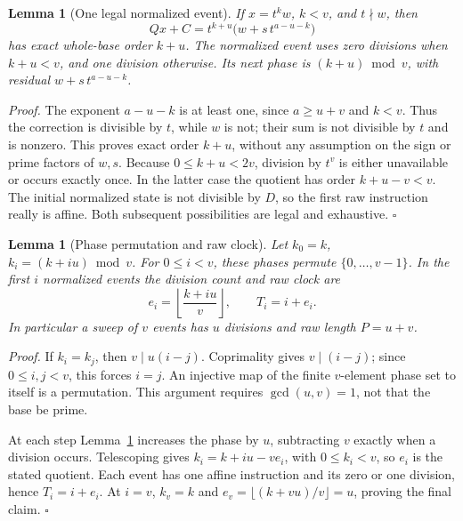 \documentclass[11pt,letterpaper]{article}
\newtheorem{lemma}[theorem]{Lemma}
\newenvironment{proof}{\noindent\textit{Proof.}}{\hfill\(\square\)}
\begin{document}
\begin{lemma}[One legal normalized event]\label{Event}
If \(x=t^k w\), \(k<v\), and \(t\nmid w\), then
\[
Qx+C=t^{k+u}\bigl(w+s\,t^{a-u-k}\bigr)
\]
has exact whole-base order \(k+u\). The normalized event uses zero divisions
when \(k+u<v\), and one division otherwise. Its next phase is
\((k+u)\bmod v\), with residual \(w+s\,t^{a-u-k}\).
\end{lemma}
\begin{proof}
The exponent \(a-u-k\) is at least one, since \(a\ge u+v\) and \(k<v\).
Thus the correction is divisible by \(t\), while \(w\) is not; their sum
is not divisible by \(t\) and is nonzero. This proves exact order \(k+u\),
without any assumption on the sign or prime factors of \(w,s\).
Because \(0\le k+u<2v\), division by \(t^v\) is either unavailable or occurs
exactly once. In the latter case the quotient has order \(k+u-v<v\).
The initial normalized state is not divisible by \(D\), so the first raw
instruction really is affine. Both subsequent possibilities are legal and
exhaustive.
\end{proof}

\begin{lemma}[Phase permutation and raw clock]\label{Permutation}
Let \(k_0=k\), \(k_i=(k+iu)\bmod v\). For \(0\le i<v\), these phases
permute \(\{0,\ldots,v-1\}\). In the first \(i\) normalized events the
division count and raw clock are
\[
e_i=\left\lfloor\frac{k+iu}{v}\right\rfloor,\qquad T_i=i+e_i.
\]
In particular a sweep of \(v\) events has \(u\) divisions and raw length
\(P=u+v\).
\end{lemma}
\begin{proof}
If \(k_i=k_j\), then \(v\mid u(i-j)\). Coprimality gives
\(v\mid(i-j)\); since \(0\le i,j<v\), this forces \(i=j\).
An injective map of the finite \(v\)-element phase set to itself is a
permutation. This argument requires \(\gcd(u,v)=1\), not that the base be prime.

At each step Lemma~\ref{Event} increases the phase by \(u\), subtracting
\(v\) exactly when a division occurs. Telescoping gives
\(k_i=k+iu-ve_i\), with \(0\le k_i<v\), so \(e_i\) is the stated quotient.
Each event has one affine instruction and its zero or one division, hence
\(T_i=i+e_i\). At \(i=v\), \(k_v=k\) and
\(e_v=\lfloor(k+vu)/v\rfloor=u\), proving the final claim.
\end{proof}
\end{document}
